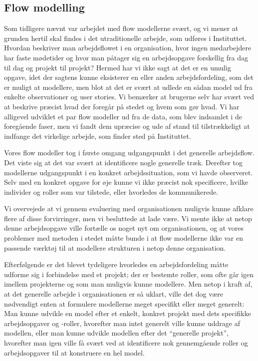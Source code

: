 \subsection{Flow modelling}
Som tidligere nævnt var arbejdet med flow modellerne svært, og vi mener at grunden hertil skal findes i det utraditionelle arbejde, som udføres i Instituttet. Hvordan beskriver man arbejdsflowet i en organisation, hvor ingen medarbejdere har faste mødetider og hvor man påtager sig en arbejdsopgave forskellig fra dag til dag og projekt til projekt? Hermed har vi ikke sagt at det er en umulig opgave, idet der sagtens kunne eksisterer en eller anden arbejdsfordeling, som det er muligt at modellere, men blot at det er svært at udlede en sådan model ud fra enkelte observationer og user stories. Vi bemærker at brugerne selv har svært ved at beskrive præcist hvad der foregår på stedet og hvem som gør hvad.
Vi har alligevel udviklet et par flow modeller ud fra de data, som blev indsamlet i de foregående faser, men vi fandt dem upræcise og ude af stand til tilstrækkeligt at indfange det virkelige arbejde, som finder sted på Instituttet. 

Vores flow modeller tog i første omgang udgangspunkt i det generelle arbejdsflow. Det viste sig at det var svært at identificere nogle generelle træk. Derefter tog modellerne udgangspunkt i en konkret arbejdssituation, som vi havde observeret. Selv med en konkret opgave for øje kunne vi ikke præcist nok specificere, hvilke individer og roller som var tilstede, eller hvorledes de kommunikerede.

Vi overvejede at vi gennem evaluering med organisationen muligvis kunne afklare flere af disse forvirringer, men vi besluttede at lade være. Vi mente ikke at netop denne arbejdsopgave ville fortælle os noget nyt om organisationen, og at vores problemer med metoden i stedet måtte bunde i at flow modellerne ikke var en passende værktøj til at modellere strukturen i netop denne organisation.

Efterfølgende er det blevet tydeligere hvorledes en arbejdsfordeling måtte udforme sig i forbindelse med et projekt; der er bestemte roller, som ofte går igen imellem projekterne og som man muligvis kunne modellere. Men netop i kraft af, at det generelle arbejde i organisationen er så uklart, ville det dog være nødvendigt enten at formulere modellerne meget specifikt eller meget generelt: Man kunne udvikle en model efter et enkelt, konkret projekt med dets specifikke arbejdsopgaver og -roller, hvorefter man intet generelt ville kunne uddrage af modellen, eller man kunne udvikle modellen efter det “generelle projekt”, hvorefter man igen ville få svært ved at identificere nok gennemgående roller og arbejdsopgaver til at konstruere en hel model.


